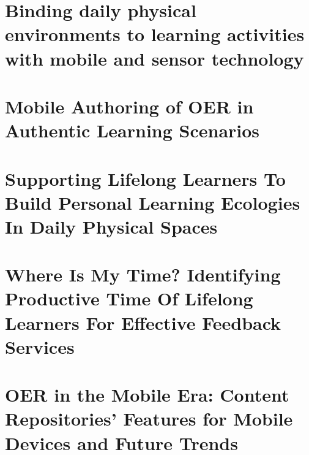 \documentclass[a4paper,12pt,twoside,openright]{book}
\begin{document}
	\part{Binding daily physical environments to learning activities with mobile and sensor technology}
		
			\clearpage{\pagestyle{empty}\cleardoublepage}	
			
	\part{Mobile Authoring of OER in Authentic Learning Scenarios}
		
			\clearpage{\pagestyle{empty}\cleardoublepage}	

	\part{Supporting Lifelong Learners To Build Personal Learning Ecologies In Daily Physical Spaces}
		
			\clearpage{\pagestyle{empty}\cleardoublepage}	
			

	\part{Where Is My Time? Identifying Productive Time Of Lifelong Learners For Effective Feedback Services}
		
			\clearpage{\pagestyle{empty}\cleardoublepage}	


	\part{OER in the Mobile Era: Content Repositories' Features for Mobile Devices and Future Trends}
		
			\clearpage{\pagestyle{empty}\cleardoublepage}	


						

%		


	

	
\backmatter

	\renewcommand{\bibname}{References}
	
	\clearpage{\pagestyle{empty}\cleardoublepage}

	
		\clearpage{\pagestyle{empty}\cleardoublepage}
\end{document}
